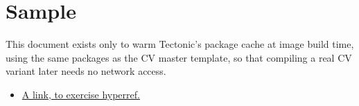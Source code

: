 \documentclass[10pt,a4paper]{article}
\begin{document}
\section{Sample}
This document exists only to warm Tectonic's package cache at image build
time, using the same packages as the CV master template, so that compiling a
real CV variant later needs no network access.

\begin{itemize}[leftmargin=1.25em]
  \item \href{https://example.test}{A link, to exercise hyperref.}
\end{itemize}
\end{document}
